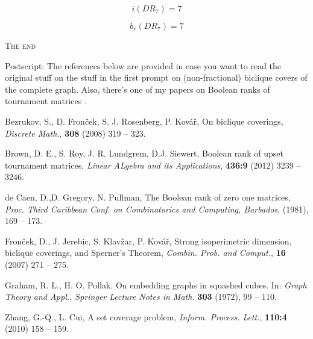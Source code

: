 \documentclass[10pt, AMS Euler]{article}
\begin{document}
     $$ i(DR_7) = 7 $$
     
     $$ b_r(DR_7) = 7 $$
	
	\begin{center}
		{\Large \textsc{The end}}
	\end{center}
	
	\noindent Postscript: The references below are provided in case you want to read the original stuff on the stuff in the first prompt on (non-fractional) biclique covers of the complete graph. 
	Also, there's one of my papers on Boolean ranks of tournament matrices \cite{BroRoy} \smiley. 
	
	\begin{thebibliography}{99}
		
		Bezrukov, S.,  D. Fron\v{c}ek, S. J. Rosenberg, P. Kov\'{a}\v{r}, On biclique coverings, \emph{Discrete Math.}, {\bf 308} (2008) 319 -- 323.
		
		Brown, D. E., S. Roy, J. R. Lundgrem, D.J. Siewert, Boolean rank of upset tournament matrices, \emph{Linear ALgebra and its Applications}, {\bf 436:9} (2012) 3239 -- 3246.
		
		de Caen, D.,D. Gregory, N. Pullman, The Boolean rank of zero one matrices, \emph{Proc. Third Caribbean Conf. on Combinatorics and Computing, Barbados},
		(1981), 169 -- 173.
		
		Fron\v{c}ek, D., J. Jerebic, S. Klav\v{z}ar, P. Kov\'{a}\v{r}, Strong isoperimetric dimension, biclique coverings, and Sperner's Theorem,
		\emph{Combin. Prob. and Comput.}, {\bf 16} (2007) 271 -- 275.
		
		Graham, R. L., H. O. Pollak. On embedding graphs in squashed cubes. In: \emph{Graph Theory and Appl., Springer Lecture Notes in Math.}
		{\bf 303} (1972), 99 -- 110.
		
		
		Zhang, G.-Q., L. Cui, A set coverage problem, \emph{Inform. Process. Lett.}, {\bf 110:4} (2010) 158 -- 159.
		
	\end{thebibliography}
\end{document}
